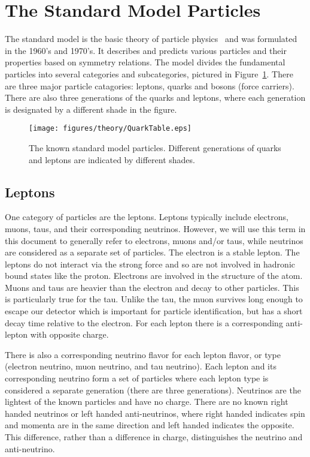 \section{The Standard Model Particles}
The standard model is the basic theory of particle physics~\cite{QuarkModelReview, PDGSummary, Griffiths, Halzen} and was formulated in the 1960's and 1970's.  It describes and predicts various particles and their properties based on symmetry relations.  The model divides the fundamental particles into several categories and subcategories, pictured in Figure~\ref{fig:SM}.  There are three major particle catagories: leptons, quarks and bosons (force carriers).  There are also three generations of the quarks and leptons, where each generation is designated by a different shade in the figure.
  
\begin{figure}[!htpb]
  \centering
    \texttt{[image: figures/theory/QuarkTable.eps]}
    \label{fig:SM} 
\caption{The known standard model particles.  Different generations of quarks and leptons are indicated by different shades.}
\end{figure}

\subsection{Leptons}
One category of particles are the leptons.  Leptons typically include electrons, muons, taus, and their corresponding neutrinos.  However, we will use this term in this document to generally refer to electrons, muons and/or taus, while neutrinos are considered as a separate set of particles.  The electron is a stable lepton.  The leptons do not interact via the strong force and so are not involved in hadronic bound states like the proton.  Electrons are involved in the structure of the atom.  Muons and taus are heavier than the electron and decay to other particles.  This is particularly true for the tau.  Unlike the tau, the muon survives long enough to escape our detector which is important for particle identification, but has a short decay time relative to the electron.  For each lepton there is a corresponding anti-lepton with opposite charge.  

There is also a corresponding neutrino flavor for each lepton flavor, or type (electron neutrino, muon neutrino, and tau neutrino).  Each lepton and its corresponding neutrino form a set of particles where each lepton type is considered a separate generation (there are three generations).  Neutrinos are the lightest of the known particles and have no charge.  There are no known right handed neutrinos or left handed anti-neutrinos, where right handed indicates spin and momenta are in the same direction and left handed indicates the opposite.  This difference, rather than a difference in charge, distinguishes the neutrino and anti-neutrino.

